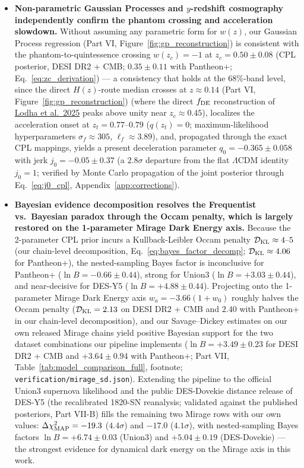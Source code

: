 \documentclass[11pt,letterpaper]{article}
\begin{document}
\begin{itemize}
    \item[\textcolor{tealaccent}{\textbullet}] \textbf{Non-parametric Gaussian Processes and $y$-redshift cosmography independently confirm the phantom crossing and acceleration slowdown.} Without assuming any parametric form for $w(z)$, our Gaussian Process regression (Part VI, Figure~\ref{fig:gp_reconstruction}) is consistent with the phantom-to-quintessence crossing $w(z_c) = -1$ at $z_c = 0.50 \pm 0.08$ (CPL posterior, DESI DR2 + CMB; $0.35 \pm 0.11$ with Pantheon+; Eq.~\ref{eq:zc_derivation}) --- a consistency that holds at the $68\%$-band level, since the direct $H(z)$-route median crosses at $z \approx 0.14$ (Part VI, Figure~\ref{fig:gp_reconstruction}) (where the direct $f_{\rm DE}$ reconstruction of \href{https://arxiv.org/abs/2503.14743}{Lodha et al.\ 2025} peaks above unity near $z_c \approx 0.45$), localizes the acceleration onset at $z_t = 0.77\text{--}0.79$ ($q(z_t) = 0$; maximum-likelihood hyperparameters $\sigma_f \approx 305$, $\ell_f \approx 3.89$), and, propagated through the exact CPL mappings, yields a present deceleration parameter $q_0 = -0.365 \pm 0.058$ with jerk $j_0 = -0.05 \pm 0.37$ (a $2.8\sigma$ departure from the flat $\Lambda$CDM identity $j_0 = 1$; verified by Monte Carlo propagation of the joint posterior through Eq.~\ref{eq:j0_cpl}, Appendix~\ref{app:corrections}).
    \item[\textcolor{tealaccent}{\textbullet}] \textbf{Bayesian evidence decomposition resolves the Frequentist vs.\ Bayesian paradox through the Occam penalty, which is largely restored on the 1-parameter Mirage Dark Energy axis.} Because the 2-parameter CPL prior incurs a Kullback-Leibler Occam penalty $\mathcal{D}_{\rm KL} \approx 4\text{--}5$ (our chain-level decomposition, Eq.~\ref{eq:bayes_factor_decomp}; $\mathcal{D}_{\rm KL} \approx 4.06$ for Pantheon+), the nested-sampling Bayes factor is inconclusive for Pantheon+ ($\ln B = -0.66 \pm 0.44$), strong for Union3 ($\ln B = +3.03 \pm 0.44$), and near-decisive for DES-Y5 ($\ln B = +4.88 \pm 0.44$). Projecting onto the 1-parameter Mirage Dark Energy axis $w_a = -3.66(1+w_0)$ roughly halves the Occam penalty ($\mathcal{D}_{\rm KL} = 2.13$ on DESI DR2 + CMB and $2.40$ with Pantheon+ in our chain-level decomposition), and our Savage--Dickey estimates on our own released Mirage chains yield positive Bayesian support for the two dataset combinations our pipeline implements ($\ln B = +3.49 \pm 0.23$ for DESI DR2 + CMB and $+3.64 \pm 0.94$ with Pantheon+; Part VII, Table~\ref{tab:model_comparison_full}, footnote; \texttt{verification/mirage\_sd.json}). Extending the pipeline to the official Union3 supernova likelihood and the public DES-Dovekie distance release of DES-Y5 (the recalibrated 1820-SN reanalysis; validated against the published posteriors, Part VII-B) fills the remaining two Mirage rows with our own values: $\Delta\chi^2_{\rm MAP} = -19.3$ ($4.4\sigma$) and $-17.0$ ($4.1\sigma$), with nested-sampling Bayes factors $\ln B = +6.74 \pm 0.03$ (Union3) and $+5.04 \pm 0.19$ (DES-Dovekie) --- the strongest evidence for dynamical dark energy on the Mirage axis in this work.
\end{itemize}
\clearpage
\end{document}
